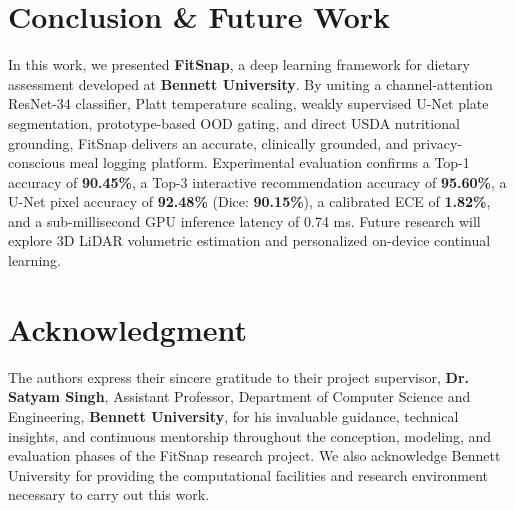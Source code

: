 \documentclass[conference]{IEEEtran}
\begin{document}
\section{Conclusion \& Future Work}
In this work, we presented \textbf{FitSnap}, a deep learning framework for dietary assessment developed at \textbf{Bennett University}. By uniting a channel-attention ResNet-34 classifier, Platt temperature scaling, weakly supervised U-Net plate segmentation, prototype-based OOD gating, and direct USDA nutritional grounding, FitSnap delivers an accurate, clinically grounded, and privacy-conscious meal logging platform. Experimental evaluation confirms a Top-1 accuracy of \textbf{90.45\%}, a Top-3 interactive recommendation accuracy of \textbf{95.60\%}, a U-Net pixel accuracy of \textbf{92.48\%} (Dice: \textbf{90.15\%}), a calibrated ECE of \textbf{1.82\%}, and a sub-millisecond GPU inference latency of 0.74 ms. Future research will explore 3D LiDAR volumetric estimation and personalized on-device continual learning.

\section*{Acknowledgment}
The authors express their sincere gratitude to their project supervisor, \textbf{Dr. Satyam Singh}, Assistant Professor, Department of Computer Science and Engineering, \textbf{Bennett University}, for his invaluable guidance, technical insights, and continuous mentorship throughout the conception, modeling, and evaluation phases of the FitSnap research project. We also acknowledge Bennett University for providing the computational facilities and research environment necessary to carry out this work.
\end{document}

